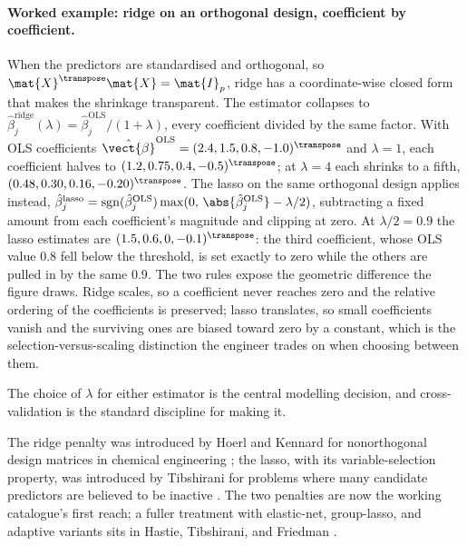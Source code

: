 \paragraph{Worked example: ridge on an orthogonal design, coefficient
by coefficient.} When the predictors are standardised and orthogonal,
so $\mat{X}^{\transpose}\mat{X} = \mat{I}_{p}$, ridge has a
coordinate-wise closed form that makes the shrinkage transparent. The
estimator collapses to $\hat{\beta}_{j}^{\mathrm{ridge}}(\lambda) =
\hat{\beta}_{j}^{\mathrm{OLS}}/(1 + \lambda)$, every coefficient
divided by the same factor. With OLS coefficients $\hat{\vect{\beta}}^{
\mathrm{OLS}} = (2.4, 1.5, 0.8, -1.0)^{\transpose}$ and $\lambda = 1$,
each coefficient halves to $(1.2, 0.75, 0.4, -0.5)^{\transpose}$; at
$\lambda = 4$ each shrinks to a fifth, $(0.48, 0.30, 0.16,
-0.20)^{\transpose}$. The lasso on the same orthogonal design applies
 instead, $\hat{\beta}_{j}^{\mathrm{lasso}}
= \operatorname{sgn}(\hat{\beta}_{j}^{\mathrm{OLS}})\max(0,\,
\abs{\hat{\beta}_{j}^{\mathrm{OLS}}} - \lambda/2)$, subtracting a fixed
amount from each coefficient's magnitude and clipping at zero. At
$\lambda/2 = 0.9$ the lasso estimates are $(1.5, 0.6, 0, -0.1)^{
\transpose}$: the third coefficient, whose OLS value $0.8$ fell below
the threshold, is set exactly to zero while the others are pulled in by
the same $0.9$. The two rules expose the geometric difference the
figure draws. Ridge scales, so a coefficient never reaches zero and
the relative ordering of the coefficients is preserved; lasso
translates, so small coefficients vanish and the surviving ones are
biased toward zero by a constant, which is the selection-versus-scaling
distinction the engineer trades on when choosing between them.

The choice of $\lambda$ for either estimator is the central
modelling decision, and cross-validation is the standard discipline
for making it.



The ridge penalty was introduced by Hoerl and Kennard for
nonorthogonal design matrices in chemical engineering
\cite{paper:v2ch14-hoerl-kennard-ridge-1970}; the lasso, with
its variable-selection property, was introduced by Tibshirani for
problems where many candidate predictors are believed to be
inactive \cite{paper:v2ch14-tibshirani-lasso-1996}. The two
penalties are now the working catalogue's first reach; a fuller
treatment with elastic-net, group-lasso, and adaptive variants
sits in Hastie, Tibshirani, and Friedman
\cite{text:hastie-tibshirani-friedman}.

